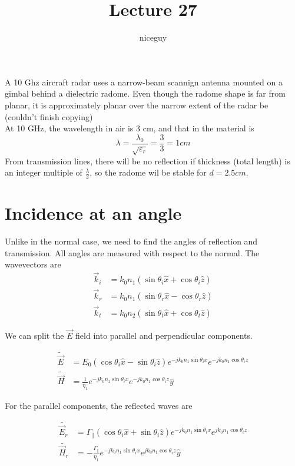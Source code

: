 \documentclass[12pt]{article}
\title{Lecture 27}
\author{niceguy}
\begin{document}
\maketitle

\begin{ex}
    A 10 Ghz aircraft radar uses a narrow-beam scannign antenna mounted on a gimbal behind a dielectric radome. Even though the radome shape is far from planar, it is approximately planar over the narrow extent of the radar be (couldn't finish copying) \\
    At 10 GHz, the wavelength in air is 3 cm, and that in the material is
    $$\lambda = \frac{\lambda_0}{\sqrt{\varepsilon_r}} = \frac{3}{3} = 1\unit{cm}$$
    From transmission lines, there will be no reflection if thickness (total length) is an integer multiple of $\frac{\lambda}{2}$, so the radome wil be stable for $d = 2.5\unit{cm}$.
\end{ex}

\section{Incidence at an angle}

Unlike in the normal case, we need to find the angles of reflection and transmission. All angles are measured with respect to the normal. The wavevectors are
\begin{align*}
    \vec k_i &= k_0n_1(\sin\theta_i\hat x + \cos\theta_i \hat z) \\
    \vec k_r &= k_0n_1(\sin\theta_r\hat x - \cos\theta_r \hat z) \\
    \vec k_t &= k_0n_2(\sin\theta_t\hat x + \cos\theta_t\hat z)
\end{align*}

We can split the $\vec E$ field into parallel and perpendicular components.

\begin{align*}
    \tilde{\vec E} &= E_0(\cos\theta_i \hat x - \sin\theta_i \hat z)e^{-jk_0n_1\sin\theta_ix}e^{-jk_0n_1\cos\theta_iz} \\
    \tilde{\vec H} &= \frac{1}{\eta_1} e^{-jk_0n_1\sin\theta_ix}e^{-jk_0n_1\cos\theta_iz} \hat y
\end{align*}

For the parallel components, the reflected waves are

\begin{align*}
    \tilde{\vec E_r} &= \Gamma_\parallel (\cos\theta_i\hat x + \sin\theta_i\hat z)e^{-jk_0n_1\sin\theta_i x}e^{jk_0n_1\cos\theta_iz} \\
    \tilde{\vec H_r} &= -\frac{\Gamma_\parallel}{\eta_1} e^{-jk_0n_1\sin\theta_ix}e^{jk_0n_1\cos\theta_iz} \hat y
\end{align*}
\end{document}
